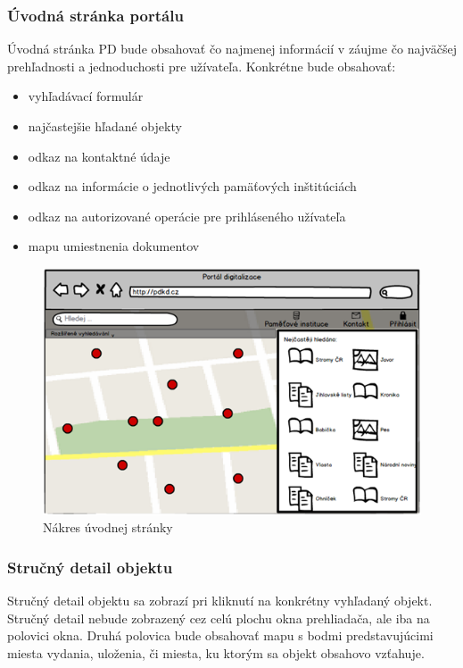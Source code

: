 \documentclass[
  print, %
  table,   %
  lof,     %
  nolot,     %
]{fithesis3}
\begin{document}
\subsubsection{Úvodná stránka portálu}
Úvodná stránka PD bude obsahovať čo najmenej informácií v záujme čo najväčšej prehľadnosti a jednoduchosti pre užívateľa. Konkrétne bude obsahovať:
\begin{itemize}
	\item vyhľadávací formulár
	\item najčastejšie hľadané objekty
	\item odkaz na kontaktné údaje
	\item odkaz na informácie o jednotlivých pamäťových inštitúciách
	\item odkaz na autorizované operácie pre prihláseného užívateľa
	\item mapu umiestnenia dokumentov
\end{itemize}
\begin{figure}[H]
	\centering
		\includegraphics[width=\textwidth]{fithesis/mockup/welcome.png}	
	\caption{Nákres úvodnej stránky}
	\label{mockup-welcome}
\end{figure}
\clearpage

\subsubsection{Stručný detail objektu}
Stručný detail objektu sa zobrazí pri kliknutí na konkrétny vyhľadaný objekt. Stručný detail nebude zobrazený cez celú plochu okna prehliadača, ale iba na polovici okna. Druhá polovica bude obsahovať mapu s bodmi predstavujúcimi miesta vydania, uloženia, či miesta, ku ktorým sa objekt obsahovo vzťahuje. 
\end{document}
